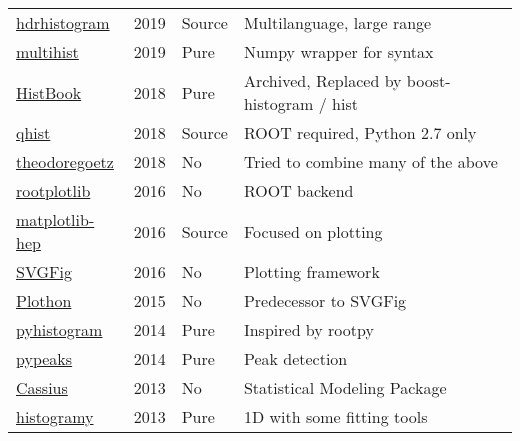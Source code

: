 \documentclass{webofc}
\begin{document}
\begin{table}[h]
\begin{tabular}{llll}
		\href{https://pypi.org/project/hdrhistogram/}{hdrhistogram}                  & 2019         & Source & Multilanguage, large range                           \\
		\href{https://pypi.org/project/multihist/}{multihist}                        & 2019         & Pure   & Numpy wrapper for syntax                             \\
		\href{https://github.com/scikit-hep/histbook}{HistBook}                      & 2018         & Pure   & Archived, Replaced by boost-histogram / hist         \\
		\href{https://pypi.org/project/qhist/}{qhist}                                & 2018         & Source & ROOT required, Python 2.7 only                       \\
		\href{https://github.com/theodoregoetz/histogram}{theodoregoetz}             & 2018         & No     & Tried to combine many of the above                   \\
		\href{https://github.com/drdavis/rootplotlib}{rootplotlib}                   & 2016         & No     & ROOT backend                                         \\
		\href{https://pypi.org/project/matplotlib-hep/}{matplotlib-hep}              & 2016         & Source & Focused on plotting                                  \\
		\href{https://github.com/jpivarski/svgfig}{SVGFig}                           & 2016         & No     & Plotting framework                                   \\
		\href{https://github.com/jpivarski/plothon}{Plothon}                         & 2015         & No     & Predecessor to SVGFig                                \\
		\href{https://pypi.org/project/pyhistogram/}{pyhistogram}                    & 2014         & Pure   & Inspired by rootpy                                   \\
		\href{https://pypi.org/project/pypeaks}{pypeaks}                             & 2014         & Pure   & Peak detection                                       \\
		\href{https://github.com/opendatagroup/cassius}{Cassius}                     & 2013         & No     & Statistical Modeling Package                         \\
		\href{https://pypi.org/project/histogramy}{histogramy}                       & 2013         & Pure   & 1D with some fitting tools                           \\

\end{tabular}
\end{table}
\end{document}
